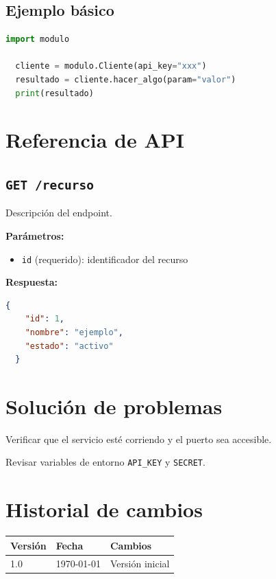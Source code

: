 \documentclass[12pt, letterpaper    ]{article}
\begin{document}
  \subsection{Ejemplo básico}

  \begin{lstlisting}[language=Python]
  import modulo

  cliente = modulo.Cliente(api_key="xxx")
  resultado = cliente.hacer_algo(param="valor")
  print(resultado)
  \end{lstlisting}

  \section{Referencia de API}

  \subsection{\texttt{GET /recurso}}

  Descripción del endpoint.

  \textbf{Parámetros:}
  \begin{itemize}
      \item \texttt{id} (requerido): identificador del recurso
  \end{itemize}

  \textbf{Respuesta:}
  \begin{lstlisting}[language=json]
  {
    "id": 1,
    "nombre": "ejemplo",
    "estado": "activo"
  }
  \end{lstlisting}

  \section{Solución de problemas}

  \begin{description}[style=nextline]
      \item[\texttt{Error: conexión rechazada}]
          Verificar que el servicio esté corriendo y el puerto sea
  accesible.
      \item[\texttt{Error: credenciales inválidas}]
          Revisar variables de entorno \texttt{API\_KEY} y
  \texttt{SECRET}.
  \end{description}

  \section{Historial de cambios}

  \begin{center}
  \begin{tabular}{lll}
      \toprule
      \textbf{Versión} & \textbf{Fecha} & \textbf{Cambios} \\
      \midrule
      1.0 & \today & Versión inicial \\
      \bottomrule
  \end{tabular}
  \end{center}

  
\end{document}
